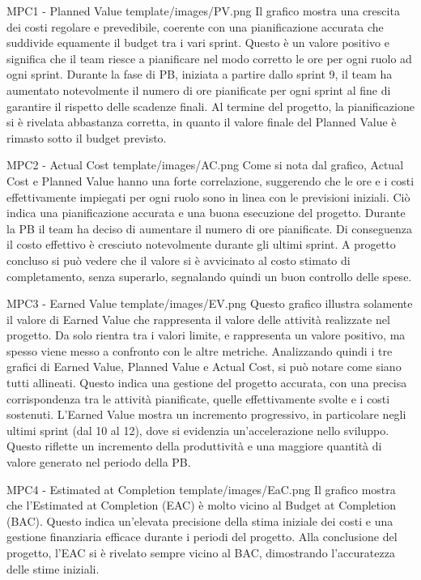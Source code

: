 \Met
{ %
    MPC1 - Planned Value
}
{ %
    template/images/PV.png
}
{ %
    Il grafico mostra una crescita dei costi regolare e prevedibile, coerente con una pianificazione accurata che suddivide equamente il budget tra i vari sprint.
    Questo è un valore positivo e significa che il team riesce a pianificare nel modo corretto le ore per ogni ruolo ad ogni sprint.
}
{ %
    Durante la fase di PB, iniziata a partire dallo sprint 9, il team ha aumentato notevolmente il numero di ore pianificate per ogni sprint al fine di garantire il rispetto delle scadenze finali.
    Al termine del progetto, la pianificazione si è rivelata abbastanza corretta, in quanto il valore finale del Planned Value è rimasto sotto il budget previsto.
}

\Met
{ %
    MPC2 - Actual Cost
}
{ %
    template/images/AC.png
}
{ %
    Come si nota dal grafico, Actual Cost e Planned Value hanno una forte correlazione, suggerendo che le ore e i costi effettivamente impiegati per ogni ruolo sono in linea con le previsioni iniziali.
    Ciò indica una pianificazione accurata e una buona esecuzione del progetto.
}
{ %
    Durante la PB il team ha deciso di aumentare il numero di ore pianificate. Di conseguenza il costo effettivo è cresciuto notevolmente durante gli ultimi sprint. A progetto concluso si può vedere che il valore si è avvicinato al costo stimato di completamento, senza superarlo, segnalando quindi un buon controllo delle spese.
}

\Met
{ %
    MPC3 - Earned Value
}
{ %
    template/images/EV.png
}
{ %
    Questo grafico illustra solamente il valore di Earned Value che rappresenta il valore delle attività realizzate nel progetto.
    Da solo rientra tra i valori limite, e rappresenta un valore positivo, ma spesso viene messo a confronto con le altre metriche.
    Analizzando quindi i tre grafici di Earned Value, Planned Value e Actual Cost, si può notare come siano tutti allineati. 
    Questo indica una gestione del progetto accurata, con una precisa corrispondenza tra le attività pianificate, quelle effettivamente svolte e i costi sostenuti.
}
{ %
    L'Earned Value mostra un incremento progressivo, in particolare negli ultimi sprint (dal 10 al 12), dove si evidenzia un'accelerazione nello sviluppo. Questo riflette un incremento della produttività e una maggiore quantità di valore generato nel periodo della PB.
}

\Met
{ %
    MPC4 - Estimated at Completion
}
{ %
    template/images/EaC.png
}
{ %
    Il grafico mostra che l'Estimated at Completion (EAC) è molto vicino al Budget at Completion (BAC).
    Questo indica un'elevata precisione della stima iniziale dei costi e una gestione finanziaria efficace durante i periodi del progetto. 
}
{ %
    Alla conclusione del progetto, l’EAC si è rivelato sempre vicino al BAC, dimostrando l’accuratezza delle stime iniziali.
}


